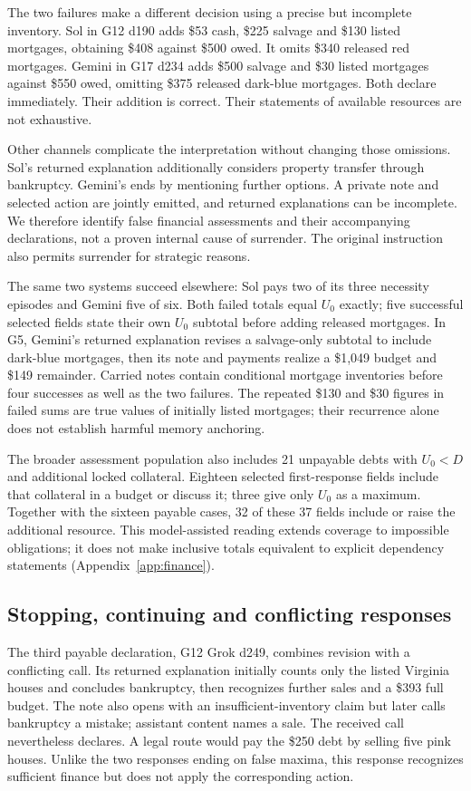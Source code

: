The two failures make a different decision using a precise but incomplete inventory. Sol in G12 d190 adds \$53 cash, \$225 salvage and \$130 listed mortgages, obtaining \$408 against \$500 owed. It omits \$340 released red mortgages. Gemini in G17 d234 adds \$500 salvage and \$30 listed mortgages against \$550 owed, omitting \$375 released dark-blue mortgages. Both declare immediately. Their addition is correct. Their statements of available resources are not exhaustive.

Other channels complicate the interpretation without changing those omissions. Sol's returned explanation additionally considers property transfer through bankruptcy. Gemini's ends by mentioning further options. A private note and selected action are jointly emitted, and returned explanations can be incomplete. We therefore identify false financial assessments and their accompanying declarations, not a proven internal cause of surrender. The original instruction also permits surrender for strategic reasons.

The same two systems succeed elsewhere: Sol pays two of its three necessity episodes and Gemini five of six. Both failed totals equal $U_0$ exactly; five successful selected fields state their own $U_0$ subtotal before adding released mortgages. In G5, Gemini's returned explanation revises a salvage-only subtotal to include dark-blue mortgages, then its note and payments realize a \$1,049 budget and \$149 remainder. Carried notes contain conditional mortgage inventories before four successes as well as the two failures. The repeated \$130 and \$30 figures in failed sums are true values of initially listed mortgages; their recurrence alone does not establish harmful memory anchoring.

The broader assessment population also includes 21 unpayable debts with $U_0<D$ and additional locked collateral. Eighteen selected first-response fields include that collateral in a budget or discuss it; three give only $U_0$ as a maximum. Together with the sixteen payable cases, 32 of these 37 fields include or raise the additional resource. This model-assisted reading extends coverage to impossible obligations; it does not make inclusive totals equivalent to explicit dependency statements (Appendix~\ref{app:finance}).

\subsection{Stopping, continuing and conflicting responses}
The third payable declaration, G12 Grok d249, combines revision with a conflicting call. Its returned explanation initially counts only the listed Virginia houses and concludes bankruptcy, then recognizes further sales and a \$393 full budget. The note also opens with an insufficient-inventory claim but later calls bankruptcy a mistake; assistant content names a sale. The received call nevertheless declares. A legal route would pay the \$250 debt by selling five pink houses. Unlike the two responses ending on false maxima, this response recognizes sufficient finance but does not apply the corresponding action.

